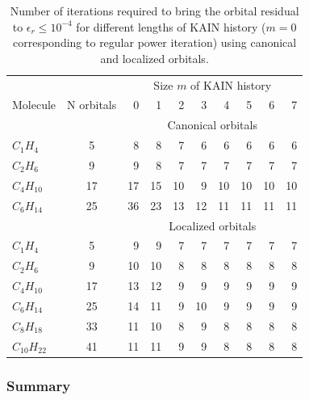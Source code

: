 \documentclass[mathserif]{beamer}
\begin{document}
\begin{frame}
\begin{table}
\scriptsize
\centering
\caption{\scriptsize{Number of iterations required to bring the orbital residual to 
	$\epsilon_r\leq10^{-4}$ for different lengths of KAIN history ($m=0$ corresponding
	to regular power iteration) using canonical and localized orbitals.}}
\begin{tabular}{lcrrrrrrrr}
\hline
\hline
	    &		&\multicolumn{8}{c}{Size $m$ of KAIN history}\\
Molecule    & N orbitals&  0	&  1    &  2    &  3    &  4    &  5    &  6    &  7    \\
\hline
&&\multicolumn{8}{c}{Canonical orbitals}\\
$C_{ 1}H_{ 4}$	&  5    &  8    &  8    &  7    &  6    &  6    &  6    &  6    &  6    \\ 
$C_{ 2}H_{ 6}$	&  9    &  9    &  8    &  7    &  7    &  7    &  7    &  7    &  7    \\ 
$C_{ 4}H_{10}$	& 17    & 17    & 15    & 10    &  9    & 10    & 10    & 10    & 10    \\
$C_{ 6}H_{14}$	& 25	& 36    & 23    & 13    & 12    & 11    & 11    & 11    & 11    \\
&&\multicolumn{8}{c}{Localized orbitals}\\
$C_{ 1}H_{ 4}$	&  5	&  9    &  9    &  7    &  7    &  7    &  7    &  7    &  7    \\ 
$C_{ 2}H_{ 6}$	&  9	& 10    & 10    &  8    &  8    &  8    &  8    &  8    &  8    \\ 
$C_{ 4}H_{10}$	& 17	& 13    & 12    &  9    &  9    &  9    &  9    &  9    &  9    \\
$C_{ 6}H_{14}$	& 25	& 14    & 11    &  9    & 10    &  9    &  9    &  9    &  9    \\
$C_{ 8}H_{18}$	& 33	& 11    & 10    &  8    &  9    &  8    &  8    &  8    &  8    \\
$C_{10}H_{22}$	& 41	& 11    & 11    &  9    &  9    &  8    &  8    &  8    &  8    \\
\hline
\hline
\end{tabular}
\end{table}
\end{frame}

\begin{frame}
    \frametitle{Summary}
\end{frame}
\end{document}
